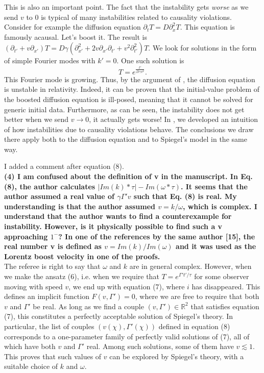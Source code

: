 \documentclass[PRD,onecolumn, nofootinbib]{revtex4-1}
\begin{document}
This is also an important point. The fact that the instability gets \textit{worse} as we send $v$ to 0 is typical of many instabilities related to causality violations. Consider for example the diffusion equation $\partial_t T =D\partial^2_x T$. This equation is famously acausal. Let's boost it. The result is $(\partial_{t'} +v\partial_{x'})T =D\gamma(\partial^2_{x'}+2v\partial_{x'}\partial_{t'} +v^2\partial^2_{t'}) T$. We look for solutions in the form of simple Fourier modes with $k'=0$. One such solution is
\begin{equation}
T=e^{\frac{t'}{D\gamma v^2}}.
\end{equation}
This Fourier mode is growing. Thus, by the argument of \citet{Hiscock_Insatibility_first_order}, the diffusion equation is unstable in relativity. Indeed, it can be proven \cite{GavassinoSuperluminal2021} that the initial-value problem of the boosted diffusion equation is ill-posed, meaning that it cannot be solved for generic initial data. Furthermore, as can be seen, the instability does not get better when we send $v\rightarrow 0$, it actually gets worse! In \cite{GavassinoSuperluminal2021}, we developed an intuition of how instabilities due to causality violations behave. The conclusions we draw there apply both to the diffusion equation and to Spiegel's model in the same way.

I added a comment after equation (8).\\ 


{\bf (4) I am confused about the definition of v in the manuscript. In Eq. (8), the
author calculates $|Im(k)*\tau|-Im(\omega*\tau)$. It seems that the author assumed
a real value of $\gamma\Gamma' v$ such that Eq. (8) is real. My understanding is
that the author assumed $v=k/\omega$, which is complex. I understand that the
author wants to find a counterexample for instability. However, is it physically
possible to find such a v approaching $1^-$? In one of the references by the same
author [15], the real number v is defined as $v=Im(k)/Im(\omega)$ and it was used
as the Lorentz boost velocity in one of the proofs.}\\

The referee is right to say that $\omega$ and $k$ are in general complex. However, when we make the ansatz (6), i.e. when we require that $T=e^{\Gamma't'/\tau}$ for some observer moving with speed $v$, we end up with equation (7), where $i$ has disappeared. This defines an implicit function $F(v,\Gamma')=0$, where we are free to require that both $v$ and $\Gamma'$ be real. As long as we find a couple $(v,\Gamma')\in \mathbb{R}^2$ that satisfies equation (7), this constitutes a perfectly acceptable solution of Spiegel's theory. In particular, the list of couples $(v(\chi),\Gamma'(\chi))$ defined in equation (8) corresponds to a one-parameter family of perfectly valid solutions of (7), all of which have both $v$ and $\Gamma'$ real. Among such solutions, some of them have $v \lesssim 1$. This proves that such values of $v$ can be explored by Spiegel's theory, with a suitable choice of $k$ and $\omega$.\\
 
\end{document}
